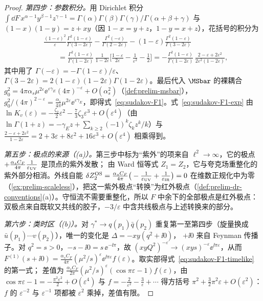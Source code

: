 \begin{proof}
\emph{第四步：参数积分。}用 Dirichlet 积分 $\int\!\dd F\,x^{\alpha-1}y^{\beta-1}z^{\gamma-1}=\Gamma(\alpha)\Gamma(\beta)\Gamma(\gamma)/\Gamma(\alpha+\beta+\gamma)$
与 $(1-x)(1-y)=z+xy$（因 $1-x=y+z$，$1-y=x+z$），花括号的积分为
\[
\begin{aligned}
&\frac{(1-\varepsilon)^2}{\varepsilon}\frac{\Gamma^2(1-\varepsilon)}{\Gamma(3-2\varepsilon)}-\frac{\Gamma^2(-\varepsilon)}{\Gamma(2-2\varepsilon)}-(1-\varepsilon)\frac{\Gamma^2(1-\varepsilon)}{\Gamma(3-2\varepsilon)}\\
&\qquad=\frac{\Gamma^2(1-\varepsilon)}{\Gamma(1-2\varepsilon)}\,\frac{1}{1-2\varepsilon}\Big[\frac{1-\varepsilon}{2\varepsilon}-\frac{1}{\varepsilon^2}-\frac12\Big]
=-\frac{\Gamma^2(1-\varepsilon)}{\Gamma(1-2\varepsilon)}\,\frac{2-\varepsilon+2\varepsilon^2}{2\varepsilon^2(1-2\varepsilon)},
\end{aligned}
\]
其中用了 $\Gamma(-\varepsilon)=-\Gamma(1-\varepsilon)/\varepsilon$、$\Gamma(3-2\varepsilon)=2(1-\varepsilon)(1-2\varepsilon)\Gamma(1-2\varepsilon)$。最后代入
$\MSbar$ 的裸耦合 $g_0^2=4\pi\alpha_s\mu^{2\varepsilon}\ee^{\varepsilon\gamma_E}(4\pi)^{-\varepsilon}+O(\alpha_s^2)$（\cref{def:prelim-msbar}），
$g_0^2/(4\pi)^{2-\varepsilon}=\frac{\alpha_s}{4\pi}\mu^{2\varepsilon}\ee^{\varepsilon\gamma_E}$，即得式~\eqref{eq:sudakov-F1}。式~\eqref{eq:sudakov-F1-exp} 由
$\ln K_v(\varepsilon)=-\frac{\zeta_2}2\varepsilon^2-\frac73\zeta_3\varepsilon^3+O(\varepsilon^4)$（由 $\ln\Gamma(1+z)=-\gamma_Ez+\sum_{k\ge2}(-1)^k\zeta_kz^k/k$）与
$\frac{2-\varepsilon+2\varepsilon^2}{1-2\varepsilon}=2+3\varepsilon+8\varepsilon^2+16\varepsilon^3+O(\varepsilon^4)$ 相乘得到。

\emph{第五步：极点的来源（(a)）。}第三步中标为“紫外”的项来自 $\ell^2\to\infty$，它的极点 $+\frac{\alpha_sC_F}{4\pi}\frac1{\varepsilon_{\rm UV}}$ 是顶点的紫外发散；
由 Ward 恒等式 $Z_1=Z_2$，它与夸克场重整化的紫外部分相消。外线自能 $\delta Z_2^{\rm OS}=\frac{\alpha_sC_F}{4\pi}\big(-\frac1{\varepsilon_{\rm UV}}+\frac1{\varepsilon_{\rm IR}}\big)=0$
在维数正规化中为零（\cref{ex:prelim-scaleless}），把这一紫外极点“转换”为红外极点（\cref{def:prelim-dr-conventions}(a)）。守恒流不需要重整化，所以 $F$ 中余下的全部极点是红外极点：
双极点来自既软又共线的胶子，$-3/\varepsilon$ 中含共线极点与上述转换来的部分。

\emph{第六步：类时区（(b)）。}对 $\gamma^*\to q(p_1)\bar q(p_2)$ 重复第一至第四步（旋量换成 $\bar u(p_1)\cdots v(p_2)$），唯一的变化是 $\Delta=-xy(q^2+\ii0)$，
$+\ii0$ 来自 Feynman 传播子。对 $q^2=s>0$，$-s-\ii0=s\,\ee^{-\ii\pi}$，故 $(xyQ^2)^{-\varepsilon}\to(xys)^{-\varepsilon}\ee^{\ii\pi\varepsilon}$，从而
$F^{(1)}(s+\ii0)=\frac{\alpha_sC_F}{4\pi}(\mu^2/s)^\varepsilon\ee^{\ii\pi\varepsilon}f(\varepsilon)$。取实部得式~\eqref{eq:sudakov-F1-timelike} 的第一式；
差值为 $\frac{\alpha_sC_F}{2\pi}(\mu^2/s)^\varepsilon(\cos\pi\varepsilon-1)f(\varepsilon)$，由 $\cos\pi\varepsilon-1=-\frac{\pi^2\varepsilon^2}2+O(\varepsilon^4)$ 与 $f=-\frac2{\varepsilon^2}-\frac3\varepsilon+\cdots$
得方括号 $\pi^2+\frac32\pi^2\varepsilon+O(\varepsilon^2)$：$f$ 的 $\varepsilon^{-2}$ 与 $\varepsilon^{-1}$ 项都被 $\varepsilon^2$ 乘掉，差值有限。
\end{proof}

